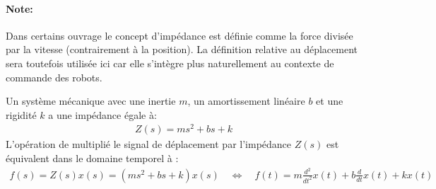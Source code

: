 \paragraph{Note:} Dans certains ouvrage le concept d'impédance est définie comme la force divisée par la vitesse (contrairement à la position). La définition relative au déplacement sera toutefois utilisée ici car elle s'intègre plus naturellement au contexte de commande des robots. 

Un système mécanique avec une inertie $m$, un amortissement linéaire $b$ et une rigidité $k$ a une impédance égale à:
\begin{align}
Z(s) = m s^2 + b s + k 
\end{align}
L'opération de multiplié le signal de déplacement par l'impédance $Z(s)$ est équivalent dans le domaine temporel à :
\begin{align}
f(s) = Z(s) x(s) = \left( m s^2 + b s + k \right) x(s) \quad \Longleftrightarrow \quad 
f(t) = m \frac{d^2}{dt^2} x(t) + b \frac{d}{dt} x(t) + k x(t) 
\end{align}


